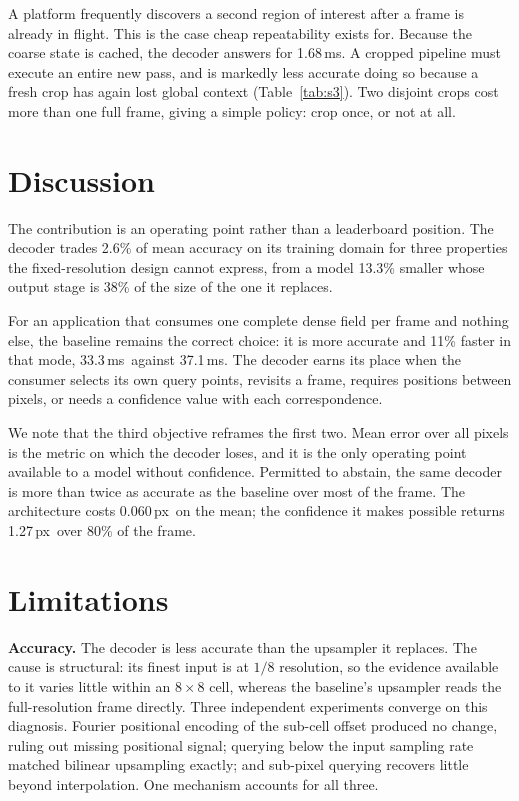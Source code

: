 \documentclass[conference]{IEEEtran}
\newcommand{\px}{\,px}
\newcommand{\ms}{\,ms}
\begin{document}
A platform frequently discovers a second region of interest after a frame is
already in flight. This is the case cheap repeatability exists for. Because the
coarse state is cached, the decoder answers for 1.68\ms. A cropped pipeline must
execute an entire new pass, and is markedly less accurate doing so because a
fresh crop has again lost global context (Table~\ref{tab:s3}). Two disjoint crops
cost more than one full frame, giving a simple policy: crop once, or not at all.

\section{Discussion}

The contribution is an operating point rather than a leaderboard position. The
decoder trades 2.6\% of mean accuracy on its training domain for three properties
the fixed-resolution design cannot express, from a model 13.3\% smaller whose
output stage is 38\% of the size of the one it replaces.

For an application that consumes one complete dense field per frame and nothing
else, the baseline remains the correct choice: it is more accurate and 11\%
faster in that mode, 33.3\ms\ against 37.1\ms. The decoder earns its place when
the consumer selects its own query points, revisits a frame, requires positions
between pixels, or needs a confidence value with each correspondence.

We note that the third objective reframes the first two. Mean error over all
pixels is the metric on which the decoder loses, and it is the only operating
point available to a model without confidence. Permitted to abstain, the same
decoder is more than twice as accurate as the baseline over most of the frame.
The architecture costs 0.060\px\ on the mean; the confidence it makes possible
returns 1.27\px\ over 80\% of the frame.

\section{Limitations}

\textbf{Accuracy.} The decoder is less accurate than the upsampler it replaces.
The cause is structural: its finest input is at $1/8$ resolution, so the evidence
available to it varies little within an $8{\times}8$ cell, whereas the baseline's
upsampler reads the full-resolution frame directly. Three independent experiments
converge on this diagnosis. Fourier positional encoding of the sub-cell offset
produced no change, ruling out missing positional signal; querying below the
input sampling rate matched bilinear upsampling exactly; and sub-pixel querying
recovers little beyond interpolation. One mechanism accounts for all three.
\end{document}
